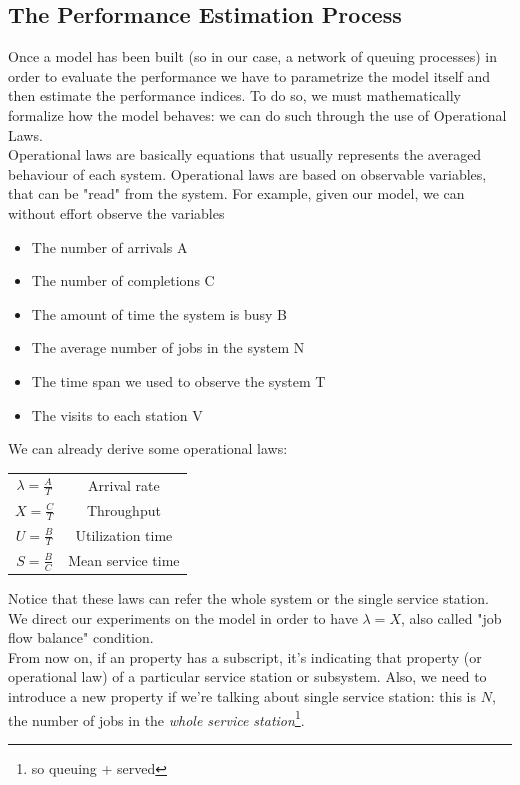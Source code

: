 \documentclass{article}
\begin{document}
			\subsection{The Performance Estimation Process}
				Once a model has been built (so in our case, a network of queuing processes) in order to evaluate the performance we have to parametrize the model itself and then estimate the performance indices. To do so, we must mathematically formalize how the model behaves: we can do such through the use of Operational Laws.\\
				Operational laws are basically equations that usually represents the averaged behaviour of each system. Operational laws are based on observable variables, that can be "read" from the system. For example, given our model, we can without effort observe the variables
				\begin{itemize}
					\item The number of arrivals A
					\item The number of completions C
					\item The amount of time the system is busy B
					\item The average number of jobs in the system N
					\item The time span we used to observe the system T
					\item The visits to each station V
				\end{itemize}
				We can already derive some operational laws:
				\begin{center}
					\begin{tabular}{ | c | c |}
						\hline
						$ \lambda = \frac{A}{T} $ & Arrival rate \\
						$ X = \frac{C}{T} $ & Throughput \\
						$ U = \frac{B}{T} $ & Utilization time \\
						$ S = \frac{B}{C} $ & Mean service time\\
						\hline
					\end{tabular}
				\end{center}

				Notice that these laws can refer the whole system or the single service station. We direct our experiments on the model in order to have $\lambda = X$, also called "job flow balance" condition.\\
				From now on, if an property has a subscript, it's indicating that property (or operational law) of a particular service station or subsystem. Also, we need to introduce a new property if we're talking about single service station: this is $N$, the number of jobs in the \emph{whole service station}\footnote{so queuing + served}.
				
\end{document}
